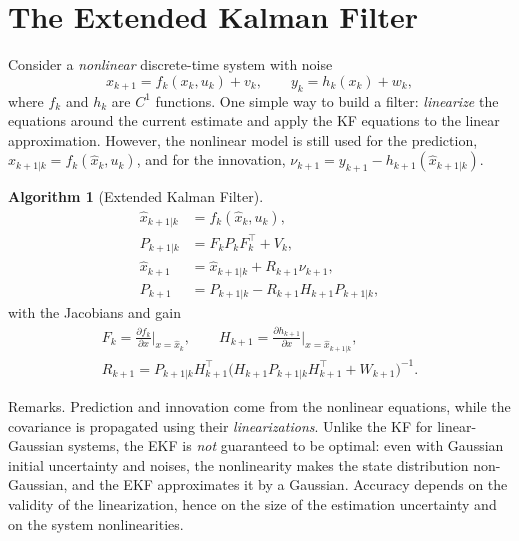 \documentclass[11pt,a4paper]{article}
\def\boldsymbol#1{#1}%
\def\mathbf#1{#1}%
\newcommand{\tp}{^{\top}}
\newcommand{\hx}{\hat{\boldsymbol{x}}}
\newcommand{\bx}{\boldsymbol{x}}
\newcommand{\bu}{\boldsymbol{u}}
\newcommand{\by}{\boldsymbol{y}}
\newcommand{\bv}{\boldsymbol{v}}
\newcommand{\bw}{\boldsymbol{w}}
\newcommand{\bnu}{\boldsymbol{\nu}}
\newcommand{\mF}{\mathbf{F}}
\newcommand{\mH}{\mathbf{H}}
\newcommand{\mP}{\mathbf{P}}
\newcommand{\mR}{\mathbf{R}}
\newcommand{\mV}{\mathbf{V}}
\newcommand{\mW}{\mathbf{W}}
\newcommand{\slides}[1]{\texorpdfstring{\hspace{0.5em}{\normalfont\small\emph{(#1)}}}{}}
\theoremstyle{definition}
\newtheorem{algorithm}[definition]{Algorithm}
\theoremstyle{plain}
\theoremstyle{remark}
\begin{document}
\section{The Extended Kalman Filter \slides{EKF deck, slides 22--24}}

Consider a \emph{nonlinear} discrete-time system with noise
\begin{equation}\label{eq:nl}
\bx_{k+1}=\boldsymbol f_k(\bx_k,\bu_k)+\bv_k,\qquad \by_k=\boldsymbol h_k(\bx_k)+\bw_k,
\end{equation}
where $\boldsymbol f_k$ and $\boldsymbol h_k$ are $C^1$ functions. One simple way to build a filter: \emph{linearize} the equations
around the current estimate and apply the KF equations to the linear approximation. However, the nonlinear model is still used for
the prediction, $\hx_{k+1|k}=\boldsymbol f_k(\hx_k,\bu_k)$, and for the innovation, $\bnu_{k+1}=\by_{k+1}-\boldsymbol h_{k+1}(\hx_{k+1|k})$.

\begin{algorithm}[Extended Kalman Filter]\label{alg:ekf}
\begin{align}
\hx_{k+1|k}&=\boldsymbol f_k(\hx_k,\bu_k),\nonumber\\
\mP_{k+1|k}&=\mF_k\mP_k\mF_k\tp+\mV_k,\nonumber\\
\hx_{k+1}&=\hx_{k+1|k}+\mR_{k+1}\bnu_{k+1},\label{eq:ekf}\\
\mP_{k+1}&=\mP_{k+1|k}-\mR_{k+1}\mH_{k+1}\mP_{k+1|k},\nonumber
\end{align}
with the Jacobians and gain
\begin{gather*}
\mF_k=\frac{\partial\boldsymbol f_k}{\partial\bx}\Big|_{\bx=\hx_k},\qquad
\mH_{k+1}=\frac{\partial\boldsymbol h_{k+1}}{\partial\bx}\Big|_{\bx=\hx_{k+1|k}},\\
\mR_{k+1}=\mP_{k+1|k}\mH_{k+1}\tp\big(\mH_{k+1}\mP_{k+1|k}\mH_{k+1}\tp+\mW_{k+1}\big)^{-1}.
\end{gather*}
\end{algorithm}

Remarks. Prediction and innovation come from the nonlinear equations, while the covariance is propagated using their
\emph{linearizations}. Unlike the KF for linear-Gaussian systems, the EKF is \emph{not} guaranteed to be optimal: even with Gaussian
initial uncertainty and noises, the nonlinearity makes the state distribution non-Gaussian, and the EKF approximates it by a Gaussian.
Accuracy depends on the validity of the linearization, hence on the size of the estimation uncertainty and on the system nonlinearities.
\end{document}
